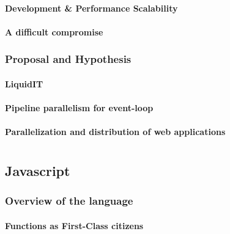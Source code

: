\documentclass[12pt]{report}
\begin{document}
      \subsubsection{Development \& Performance Scalability}
      \subsubsection{A difficult compromise}
    \subsection{Proposal and Hypothesis}

      \subsubsection{LiquidIT}
      \subsubsection{Pipeline parallelism for event-loop}
      \subsubsection{Parallelization and distribution of web applications}


% 


\chapter{}

  \section{Javascript}
    \subsection{Overview of the language}
      \subsubsection{Functions as First-Class citizens}
\end{document}
